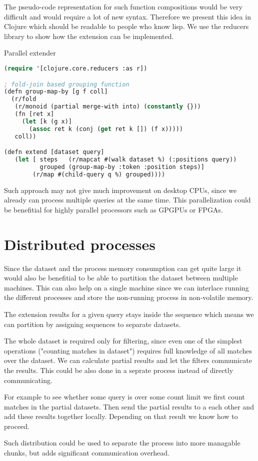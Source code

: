 The pseudo-code representation for such function compositions would be very difficult and would require a lot of new syntax. Therefore we present this idea in Clojure\cite{clojure} which should be readable to people who know lisp. We use the reducers library to show how the extension can be implemented.

\begin{algorithm}[H]
	\caption{Parallel extender}
\begin{lstlisting}[language=Lisp]
(require '[clojure.core.reducers :as r])

; fold-join based grouping function
(defn group-map-by [g f coll]
  (r/fold 
   (r/monoid (partial merge-with into) (constantly {}))
   (fn [ret x]
     (let [k (g x)]
       (assoc ret k (conj (get ret k []) (f x)))))
   coll))

(defn extend [dataset query]
   (let [ steps   (r/mapcat #(walk dataset %) (:positions query))
          grouped (group-map-by :token :position steps)]
        (r/map #(child-query q %) grouped))))
\end{lstlisting}
\end{algorithm}

Such approach may not give much improvement on desktop CPUs, since we already can process multiple queries at the same time. This parallelization could be benefitial for highly parallel processors such as GPGPUs or FPGAs.

\section{Distributed processes}

Since the dataset and the process memory consumption can get quite large it would also be benefitial to be able to partition the dataset between multiple machines. This can also help on a single machine since we can interlace running the different processes and store the non-running process in non-volatile memory.

The extension results for a given query stays inside the sequence which means we can partition by assigning sequences to separate datasets.

The whole dataset is required only for filtering, since even one of the simplest operations ("counting matches in dataset") requires full knowledge of all matches over the dataset. We can calculate partial results and let the filters communicate the results. This could be also done in a seprate process instead of directly communicating.

\begin{figure}[H]
	\scalebox{0.8}{}
\end{figure}

\begin{exmp}
For example to see whether some query is over some count limit we first count matches in the partial datasets. Then send the partial results to a each other and add these results together locally. Depending on that result we know how to proceed.
\end{exmp}

Such distribution could be used to separate the process into more managable chunks, but adds significant communication overhead.
